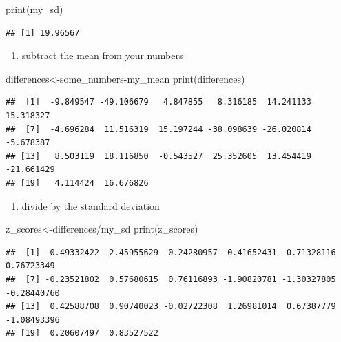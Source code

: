 \documentclass[
]{book}
\newenvironment{Shaded}{\begin{snugshade}}{\end{snugshade}}
\newcommand{\FunctionTok}[1]{\textcolor[rgb]{0.00,0.00,0.00}{#1}}
\newcommand{\NormalTok}[1]{#1}
\newcommand{\OtherTok}[1]{\textcolor[rgb]{0.56,0.35,0.01}{#1}}
\newcommand{\SpecialCharTok}[1]{\textcolor[rgb]{0.00,0.00,0.00}{#1}}
\providecommand{\tightlist}{%
  \setlength{\itemsep}{0pt}\setlength{\parskip}{0pt}}
\begin{document}
\begin{Shaded}
\begin{Highlighting}[]
\FunctionTok{print}\NormalTok{(my\_sd)}
\end{Highlighting}
\end{Shaded}

\begin{verbatim}
## [1] 19.96567
\end{verbatim}

\begin{enumerate}
\def\labelenumi{\arabic{enumi}.}
\setcounter{enumi}{2}
\tightlist
\item
  subtract the mean from your numbers
\end{enumerate}

\begin{Shaded}
\begin{Highlighting}[]
\NormalTok{differences}\OtherTok{\textless{}{-}}\NormalTok{some\_numbers}\SpecialCharTok{{-}}\NormalTok{my\_mean}
\FunctionTok{print}\NormalTok{(differences)}
\end{Highlighting}
\end{Shaded}

\begin{verbatim}
##  [1]  -9.849547 -49.106679   4.847855   8.316185  14.241133  15.318327
##  [7]  -4.696284  11.516319  15.197244 -38.098639 -26.020814  -5.678387
## [13]   8.503119  18.116850  -0.543527  25.352605  13.454419 -21.661429
## [19]   4.114424  16.676826
\end{verbatim}

\begin{enumerate}
\def\labelenumi{\arabic{enumi}.}
\setcounter{enumi}{3}
\tightlist
\item
  divide by the standard deviation
\end{enumerate}

\begin{Shaded}
\begin{Highlighting}[]
\NormalTok{z\_scores}\OtherTok{\textless{}{-}}\NormalTok{differences}\SpecialCharTok{/}\NormalTok{my\_sd}
\FunctionTok{print}\NormalTok{(z\_scores)}
\end{Highlighting}
\end{Shaded}

\begin{verbatim}
##  [1] -0.49332422 -2.45955629  0.24280957  0.41652431  0.71328116  0.76723349
##  [7] -0.23521802  0.57680615  0.76116893 -1.90820781 -1.30327805 -0.28440760
## [13]  0.42588708  0.90740023 -0.02722308  1.26981014  0.67387779 -1.08493396
## [19]  0.20607497  0.83527522
\end{verbatim}
\end{document}
